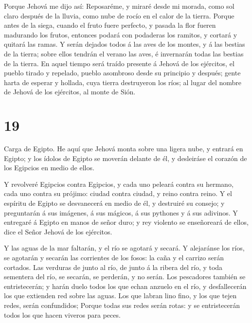  Porque Jehová me dijo así: Reposaréme, y miraré desde mi
morada, como sol claro después de la lluvia, como nube de rocío en el
calor de la tierra.  Porque antes de la siega, cuando el
fruto fuere perfecto, y pasada la flor fueren madurando los frutos,
entonces podará con podaderas los ramitos, y cortará y quitará las
ramas.  Y serán dejados todos á las aves de los montes, y á
las bestias de la tierra; sobre ellos tendrán el verano las aves, é
invernarán todas las bestias de la tierra.  En aquel tiempo
será traído presente á Jehová de los ejércitos, el pueblo tirado y
repelado, pueblo asombroso desde su principio y después; gente harta de
esperar y hollada, cuya tierra destruyeron los ríos; al lugar del nombre
de Jehová de los ejércitos, al monte de Sión.

\hypertarget{section-18}{%
\section{19}\label{section-18}}

 Carga de Egipto. He aquí que Jehová monta sobre una ligera
nube, y entrará en Egipto; y los ídolos de Egipto se moverán delante de
él, y desleiráse el corazón de los Egipcios en medio de ellos.

 Y revolveré Egipcios contra Egipcios, y cada uno peleará
contra su hermano, cada uno contra su prójimo: ciudad contra ciudad, y
reino contra reino.  Y el espíritu de Egipto se desvanecerá
en medio de él, y destruiré su consejo; y preguntarán á sus imágenes, á
sus mágicos, á sus pythones y á sus adivinos.  Y entregaré á
Egipto en manos de señor duro; y rey violento se enseñoreará de ellos,
dice el Señor Jehová de los ejércitos.

 Y las aguas de la mar faltarán, y el río se agotará y
secará.  Y alejaránse los ríos, se agotarán y secarán las
corrientes de los fosos: la caña y el carrizo serán cortados.
 Las verduras de junto al río, de junto á la ribera del río,
y toda sementera del río, se secarán, se perderán, y no serán.
 Los pescadores también se entristecerán; y harán duelo
todos los que echan anzuelo en el río, y desfallecerán los que extienden
red sobre las aguas.  Los que labran lino fino, y los que
tejen redes, serán confundidos;  Porque todas sus redes
serán rotas: y se entristecerán todos los que hacen viveros para peces.

